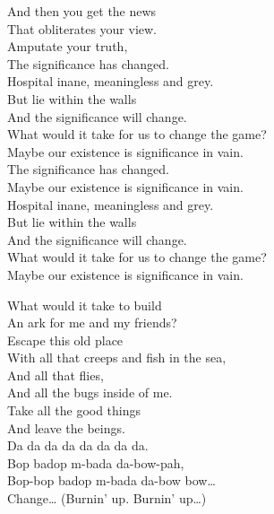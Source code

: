 And then you get the news \\
That obliterates your view. \\
Amputate your truth, \\
The significance has changed. \\

Hospital inane, meaningless and grey. \\
But lie within the walls \\
And the significance will change. \\
What would it take for us to change the game? \\
Maybe our existence is significance in vain. \\

The significance has changed. \\
Maybe our existence is significance in vain. \\

Hospital inane, meaningless and grey. \\
But lie within the walls \\
And the significance will change. \\
What would it take for us to change the game? \\
Maybe our existence is significance in vain. \\


What would it take to build \\
An ark for me and my friends? \\
Escape this old place \\
With all that creeps and fish in the sea, \\
And all that flies, \\
And all the bugs inside of me. \\
Take all the good things \\
And leave the  beings. \\

Da da da da da da da da. \\
Bop badop m-bada da-bow-pah, \\
Bop-bop badop m-bada da-bow bow… \\

Change… (Burnin' up. Burnin' up…) \\



